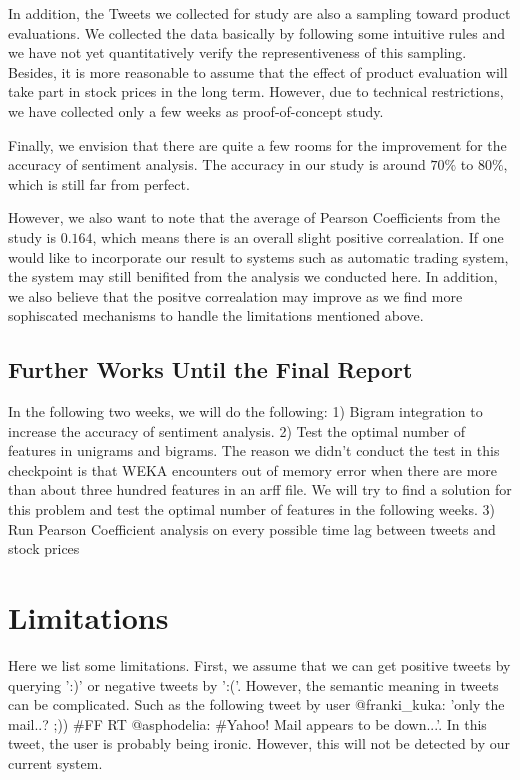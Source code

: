 \documentclass[12pt]{article}
\begin{document}
In addition, the Tweets we collected for study are also a sampling toward product evaluations. We collected the data basically by following some intuitive rules and we have not yet quantitatively verify the representiveness of this sampling. Besides, it is more reasonable to assume that the effect of product evaluation will take part in stock prices in the long term. However, due to technical restrictions, we have collected only a few weeks as proof-of-concept study.

Finally, we envision that there are quite a few rooms for the improvement for the accuracy of sentiment analysis. The accuracy in our study is around $70\%$ to $80\%$, which is still far from perfect.

However, we also want to note that the average of Pearson Coefficients from the study is $0.164$, which means there is an overall slight positive correalation. If one would like to incorporate our result to systems such as automatic trading system, the system may still benifited from the analysis we conducted here. In addition, we also believe that the positve correalation may improve as we find more sophiscated mechanisms to handle the limitations mentioned above.

\subsection{Further Works Until the Final Report}
In the following two weeks, we will do the following: 1) Bigram integration to increase the accuracy of sentiment analysis. 2) Test the optimal number of features in unigrams and bigrams. The reason we didn't conduct the test in this checkpoint is that WEKA encounters out of memory error when there are more than about three hundred features in an arff file. We will try to find a solution for this problem and test the optimal number of features in the following weeks. 3) Run Pearson Coefficient analysis on every possible time lag between tweets and stock prices

\section{Limitations}
Here we list some limitations. First, we assume that we can get positive tweets by querying ':)' or negative tweets by ':('. However, the semantic meaning in tweets can be complicated. Such as the following tweet by user @franki\_kuka: 'only the mail..? ;)) \#FF RT @asphodelia: \#Yahoo! Mail appears to be down...'. In this tweet, the user is probably being ironic. However, this will not be detected by our current system.
\end{document}
